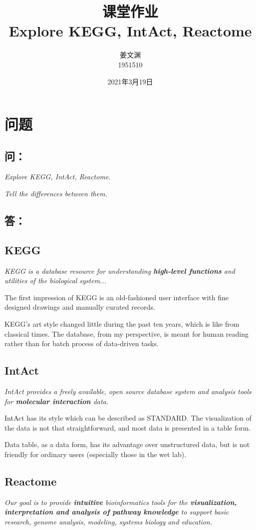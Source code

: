 \documentclass[cn,black,12pt,normal]{elegantnote}
\title{课堂作业\\Explore KEGG, IntAct, Reactome}
\author{姜文渊\\1951510}
\institute{School of Life Science, Tongji University}
\date{2021年3月19日}
\newcommand{\upcite}[1]{\textsuperscript{\textsuperscript{\cite{#1}}}}
\begin{document}
\maketitle


\section{问题}
\subsection*{问：}

\textit{Explore KEGG, IntAct, Reactome.}

\textit{Tell the differences between them.}

\subsection*{答：}

\subsection{KEGG}
\textit{KEGG is a database resource for understanding \textbf{high-level functions} and utilities of the biological system...}\upcite{kanehisa2000kegg}

The first impression of KEGG is an old-fashioned user interface with fine designed drawings and manually curated records.

KEGG’s art style changed little during the past ten years, which is like from classical times. 
The database, from my perspective, is meant for human reading rather than for batch process of data-driven tasks.

\subsection{IntAct}
\textit{IntAct provides a freely available, open source database system and analysis tools for \textbf{molecular interaction} data.}\upcite{orchard2014mintact}

IntAct has its style which can be described as STANDARD. 
The visualization of the data is not that straightforward, and most data is presented in a table form.

Data table, as a data form, has its advantage over unstructured data, 
but is not friendly for ordinary users (especially those in the wet lab).

\subsection{Reactome}
\textit{Our goal is to provide \textbf{intuitive} bioinformatics tools for the \textbf{visualization, interpretation and analysis of pathway knowledge} to support basic research, genome analysis, modeling, systems biology and education. }\upcite{fabregat2018reactome}
\end{document}
